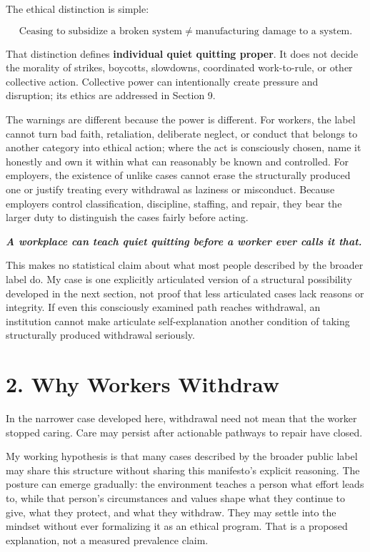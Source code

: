 \documentclass[11pt,oneside]{article}
\renewenvironment{quote}
  {\begin{tcolorbox}[
      enhanced,
      breakable,
      colback=ManifestLight,
      colframe=ManifestRule,
      boxrule=0pt,
      leftrule=3pt,
      arc=0pt,
      outer arc=0pt,
      left=10pt,right=10pt,top=8pt,bottom=8pt,
      before skip=0.8em,after skip=0.8em
    ]\itshape}
  {\end{tcolorbox}}
\begin{document}
The ethical distinction is simple:

\[
\boxed{\text{Ceasing to subsidize a broken system} \neq \text{manufacturing damage to a system}.}
\]

That distinction defines \textbf{individual quiet quitting proper}. It
does not decide the morality of strikes, boycotts, slowdowns,
coordinated work-to-rule, or other collective action. Collective power
can intentionally create pressure and disruption; its ethics are
addressed in Section 9.

The warnings are different because the power is different. For workers,
the label cannot turn bad faith, retaliation, deliberate neglect, or
conduct that belongs to another category into ethical action; where the
act is consciously chosen, name it honestly and own it within what can
reasonably be known and controlled. For employers, the existence of
unlike cases cannot erase the structurally produced one or justify
treating every withdrawal as laziness or misconduct. Because employers
control classification, discipline, staffing, and repair, they bear the
larger duty to distinguish the cases fairly before acting.

\begin{quote}
\textbf{A workplace can teach quiet quitting before a worker ever calls
it that.}
\end{quote}

This makes no statistical claim about what most people described by the
broader label do. My case is one explicitly articulated version of a
structural possibility developed in the next section, not proof that
less articulated cases lack reasons or integrity. If even this
consciously examined path reaches withdrawal, an institution cannot make
articulate self-explanation another condition of taking structurally
produced withdrawal seriously.

\hypertarget{why-workers-withdraw}{%
\section{2. Why Workers Withdraw}\label{why-workers-withdraw}}

In the narrower case developed here, withdrawal need not mean that the
worker stopped caring. Care may persist after actionable pathways to
repair have closed.

My working hypothesis is that many cases described by the broader public
label may share this structure without sharing this manifesto's explicit
reasoning. The posture can emerge gradually: the environment teaches a
person what effort leads to, while that person's circumstances and
values shape what they continue to give, what they protect, and what
they withdraw. They may settle into the mindset without ever formalizing
it as an ethical program. That is a proposed explanation, not a measured
prevalence claim.
\end{document}
